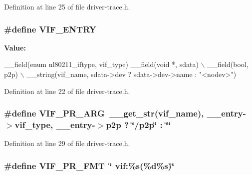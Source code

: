 Definition at line 25 of file driver-\/trace.\-h.

\hypertarget{driver-trace_8h_af9528f0b6f59f04b6c6ab283b1b65d9d}{
\subsubsection[{V\-I\-F\-\_\-\-E\-N\-T\-R\-Y}]{\setlength{\rightskip}{0pt plus 5cm}\#define V\-I\-F\-\_\-\-E\-N\-T\-R\-Y}}\label{driver-trace_8h_af9528f0b6f59f04b6c6ab283b1b65d9d}
{\bfseries Value\-:}
\begin{DoxyCode}
\_\_field(\textcolor{keyword}{enum} nl80211\_iftype, vif\_type) \_\_field(\textcolor{keywordtype}{void} *, sdata)   \(\backslash\)
            \_\_field(\textcolor{keywordtype}{bool}, p2p)                      \(\backslash\)
            \_\_string(vif\_name, sdata->dev ? sdata->dev->name : "<nodev>")
\end{DoxyCode}


Definition at line 22 of file driver-\/trace.\-h.

\hypertarget{driver-trace_8h_a12c9f3afcd1c461f7ae2f86fd8503977}{
\subsubsection[{V\-I\-F\-\_\-\-P\-R\-\_\-\-A\-R\-G}]{\setlength{\rightskip}{0pt plus 5cm}\#define V\-I\-F\-\_\-\-P\-R\-\_\-\-A\-R\-G~\-\_\-\-\_\-get\-\_\-str(vif\-\_\-name), \-\_\-\-\_\-entry-\/$>$vif\-\_\-type, \-\_\-\-\_\-entry-\/$>$p2p ? \char`\"{}/p2p\char`\"{} \-: \char`\"{}\char`\"{}}}\label{driver-trace_8h_a12c9f3afcd1c461f7ae2f86fd8503977}


Definition at line 29 of file driver-\/trace.\-h.

\hypertarget{driver-trace_8h_a50711161ccfc99a73b43b988149a61a5}{
\subsubsection[{V\-I\-F\-\_\-\-P\-R\-\_\-\-F\-M\-T}]{\setlength{\rightskip}{0pt plus 5cm}\#define V\-I\-F\-\_\-\-P\-R\-\_\-\-F\-M\-T~\char`\"{} vif\-:\%s(\%d\%s)\char`\"{}}}\label{driver-trace_8h_a50711161ccfc99a73b43b988149a61a5}



